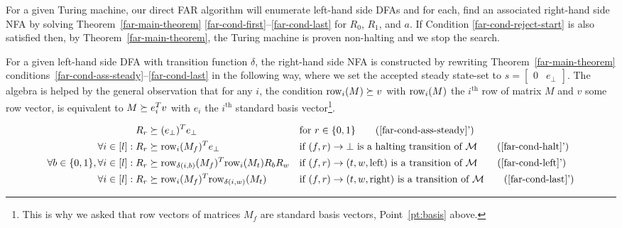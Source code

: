For a given Turing machine, our direct FAR algorithm will enumerate left-hand side DFAs and for each, find an associated right-hand side NFA by solving Theorem~\ref{far-main-theorem} \eqref{far-cond-first}--\eqref{far-cond-last} for $R_0$, $R_1$, and $a$. If Condition \eqref{far-cond-reject-start} is also satisfied then, by Theorem~\ref{far-main-theorem}, the Turing machine is proven non-halting and we stop the search.


For a given left-hand side DFA with transition function $\delta$, the right-hand side NFA is constructed by rewriting Theorem~\ref{far-main-theorem} conditions~\eqref{far-cond-ass-steady}--\eqref{far-cond-last} in the following way, where we set the accepted steady state-set to $s=\begin{bmatrix}0&e_\bot\end{bmatrix}$. The algebra is helped by the general observation that for any $i$, the condition $\text{row}_i(M) \succeq v$ with $\text{row}_i(M)$ the $i^\text{th}$ row of matrix $M$ and $v$ some row vector, is equivalent to $M\succeq e_i^T v$ with $e_i$ the $i^\text{th}$ standard basis vector\footnote{This is why we asked that row vectors of matrices $M_f$ are standard basis vectors, Point~\ref{pt:basis} above.}.



\begin{align}
  R_r                                        & \succeq (e_\bot)\T e_\bot
                                             &                                               & \text{for }r\in\{0,1\}
  \tag{\ref{far-cond-ass-steady}'}
  \\
  \forall i\in[l]: R_r                       & \succeq \row_i(M_f)\T e_\bot
                                             &                                               & \text{if $(f,r) \to \bot$ is a halting transition of $\mathcal{M}$}
  \tag{\ref{far-cond-halt}'}
  \\
  \forall b \in\{0,1\}, \forall i\in[l]: R_r & \succeq
  \row_{\delta(i,b)}(M_f)\T \row_i(M_t)R_b R_w
                                             &                                               & \text{if $(f,r) \to (t,w,\text{left})$ is a transition of $\mathcal{M}$}
  \tag{\ref{far-cond-left}'}
  \\
  \forall i\in[l]: R_r                       & \succeq \row_i(M_f)\T \row_{\delta(i,w)}(M_t)
                                             &                                               & \text{if $(f,r) \to (t,w,\text{right})$ is a transition of $\mathcal{M}$}
  \tag{\ref{far-cond-last}'}
\end{align}

